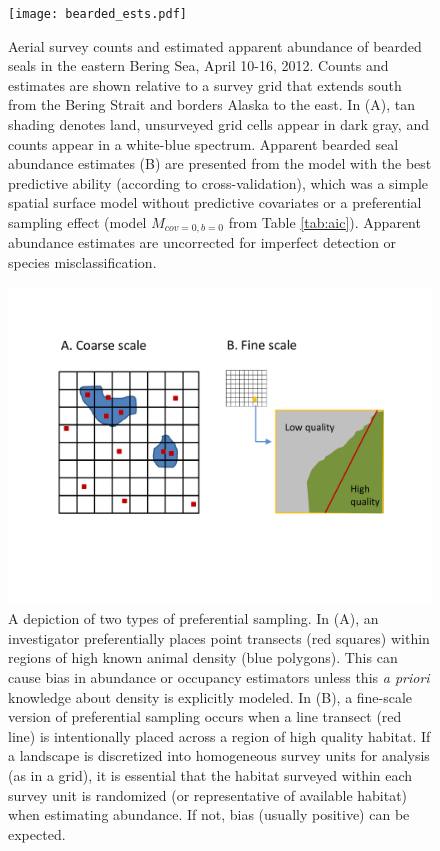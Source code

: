 \documentclass[times,mee,doublespace,]{besauth2}
\begin{document}
\begin{figure} %
\begin{center}
\texttt{[image: bearded\_ests.pdf]}
\caption{Aerial survey counts and estimated apparent abundance of bearded seals in the eastern Bering Sea, April 10-16, 2012. Counts and estimates are shown relative to a survey grid that extends south from the Bering Strait and borders Alaska to the east. In (A), tan shading denotes land, unsurveyed grid cells appear in dark gray, and counts appear in a white-blue spectrum.  Apparent bearded seal abundance estimates (B) are presented from the model with the best predictive ability (according to cross-validation), which was a simple spatial surface model without predictive covariates or a preferential sampling effect (model $M_{cov=0,b=0}$ from Table \ref{tab:aic}).  Apparent abundance estimates are uncorrected for imperfect detection or species misclassification.}
\label{fig:bearded_ests}
\end{center}
\end{figure}

\begin{figure} %
\begin{center}
\includegraphics[width=170mm]{Pref_sampling_diag.pdf}
\caption{A depiction of two types of preferential sampling.  In (A), an investigator preferentially places point transects (red squares) within regions of high known animal density (blue polygons).  This can cause bias in abundance or occupancy estimators unless this \textit{a priori} knowledge about density is explicitly modeled.  In (B), a fine-scale version of preferential sampling occurs when a line transect (red line) is intentionally placed across a region of high quality habitat.  If a landscape is discretized into homogeneous survey units for analysis (as in a grid), it is essential that the habitat surveyed within each survey unit is randomized (or representative of available habitat) when estimating abundance.  If not, bias (usually positive) can be expected.}
\label{fig:pref}
\end{center}
\end{figure}
\end{document}

